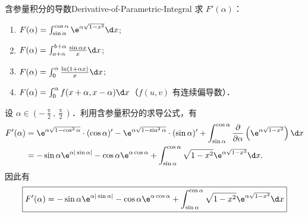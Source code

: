 \begin{problem}{含参量积分的导数}{Derivative-of-Parametric-Integral}
    求 $F'(\alpha)$：
    \begin{enumerate}
        \item $F(\alpha) = \int_{\sin \alpha}^{\cos \alpha} \e^{\alpha \sqrt{1-x^2}} \d x$;
        \item $F(\alpha) = \int_{a+\alpha}^{b+\alpha} \frac{\sin \alpha x}{x} \d x$;
        \item $F(\alpha) = \int_{0}^{\alpha} \frac{\ln(1 + \alpha x)}{x} \d x$;
        \item $F(\alpha) = \int_{0}^{\alpha} f(x+\alpha, x-\alpha) \d x$（$f(u,v)$ 有连续偏导数）．
    \end{enumerate}
\end{problem}

\begin{solution}

    设 $\alpha \in \left(-\frac{\uppi}{2}, \frac{\uppi}{2}\right)$．利用含参量积分的求导公式，有
    \begin{equation}
        \begin{aligned}
            F'(\alpha) & = \e^{\alpha \sqrt{1 - \cos^2 \alpha}} \cdot (\cos \alpha)' - \e^{\alpha \sqrt{1 - \sin^2 \alpha}} \cdot (\sin \alpha)' + \int_{\sin \alpha}^{\cos \alpha} \frac{\partial}{\partial \alpha} \left( \e^{\alpha \sqrt{1 - x^2}} \right) \d x \\
                       & = -\sin \alpha \e^{\alpha |\sin \alpha|} - \cos \alpha \e^{\alpha \cos \alpha} + \int_{\sin \alpha}^{\cos \alpha} \sqrt{1-x^2} \e^{\alpha \sqrt{1-x^2}} \d x.
        \end{aligned}
    \end{equation}
    因此有
    \begin{equation}
        \boxed{F'(\alpha) = -\sin \alpha \e^{\alpha |\sin \alpha|} - \cos \alpha \e^{\alpha \cos \alpha} + \int_{\sin \alpha}^{\cos \alpha} \sqrt{1-x^2} \e^{\alpha \sqrt{1-x^2}} \d x}
    \end{equation}



\end{solution}

